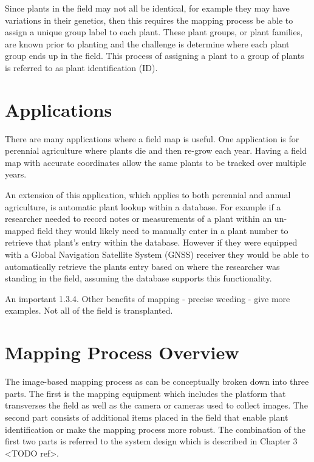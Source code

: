 Since plants in the field may not all be identical, for example they may have variations in their genetics, then this requires the mapping process be able to assign a unique group label to each plant.  These plant groups, or plant families, are known prior to planting and the challenge is determine where each plant group ends up in the field.  This process of assigning a plant to a group of plants is referred to as plant identification (ID).

\section{Applications}

There are many applications where a field map is useful.  One application is for perennial agriculture where plants die and then re-grow each year.  Having a field map with accurate coordinates allow the same plants to be tracked over multiple years.

An extension of this application, which applies to both perennial and annual agriculture, is automatic plant lookup within a database.  For example if a researcher needed to record notes or measurements of a plant within an un-mapped field they would likely need to manually enter in a plant number to retrieve that plant's entry within the database.  However if they were equipped with a Global Navigation Satellite System (GNSS) receiver they would be able to automatically retrieve the plants entry based on where the researcher was standing in the field, assuming the database supports this functionality. 

An important  
1.3.4.	Other benefits of mapping - precise weeding - give more examples.  Not all of the field is transplanted. 

\section{Mapping Process Overview} 

The image-based mapping process as can be conceptually broken down into three parts.  The first is the mapping equipment which includes the platform that transverses the field as well as the camera or cameras used to collect images.  The second part consists of additional items placed in the field that enable plant identification or make the mapping process more robust.  The combination of the first two parts is referred to the system design which is described in Chapter 3 <TODO ref>. 

